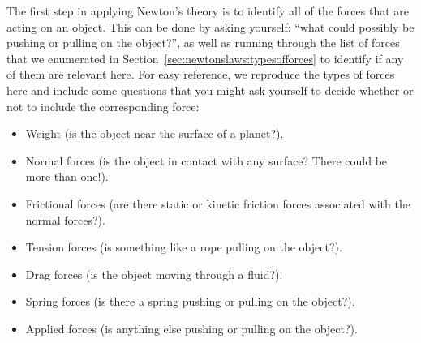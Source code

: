 The first step in applying Newton's theory is to identify all of the forces that are acting on an object. This can be done by asking yourself: ``what could possibly be pushing or pulling on the object?'', as well as running through the list of forces that we enumerated in Section~\ref{sec:newtonslaws:typesofforces} to identify if any of them are relevant here. For easy reference, we reproduce the types of forces here and include some questions that you might ask yourself to decide whether or not to include the corresponding force:

\begin{itemize}
\item Weight (is the object near the surface of a planet?).
\item Normal forces (is the object in contact with any surface? There could be more than one!).
\item Frictional forces (are there static or kinetic friction forces associated with the normal forces?).
\item Tension forces (is something like a rope pulling on the object?).
\item Drag forces (is the object moving through a fluid?).
\item Spring forces (is there a spring pushing or pulling on the object?).
\item Applied forces (is anything else pushing or pulling on the object?).
\end{itemize}


